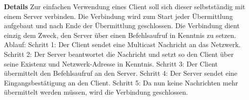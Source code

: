 \documentclass[a4paper,12pt]{article}
\begin{document}
\begin{itemize}[nosep]
\begin{minipage}[t]{\linewidth}
\subitem \textbf{Details} Zur einfachen Verwendung eines \gls{Client} soll sich dieser selbstständig mit einem \gls{Server} verbinden.\newline
Die Verbindung wird zum Start jeder Übermittlung aufgebaut und nach Ende der Übermittlung geschlossen.\newline
Die Verbindung dient einzig dem Zweck, den \gls{Server} über einen Befehlsaufruf  in Kenntnis zu setzen.\newline
Ablauf:\newline
Schritt 1: Der \gls{Client} sendet eine \gls{Multicast} Nachricht an das Netzwerk.\newline
Schritt 2: Der \gls{Server} beantwortet die Nachricht und setzt so den \gls{Client} über seine Existenz und Netzwerk-Adresse in Kenntnis.\newline
Schritt 3: Der \gls{Client} übermittelt den Befehlsaufruf an den Server.\newline
Schritt 4: Der \gls{Server} sendet eine Eingangsbestätigung an den \gls{Client}.\newline
Schritt 5: Da nun keine Nachrichten mehr übermittelt werden müssen, wird die Verbindung geschlossen.
\end{minipage}
\pagebreak


\end{itemize}
\end{document}
